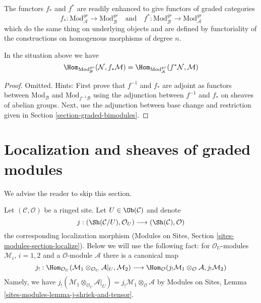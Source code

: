 \medskip\noindent
The functors $f_*$ and $f^*$ are readily enhanced to give
functors of graded categories
$$
f_* :
\text{Mod}^{gr}_\mathcal{A}
\longrightarrow
\text{Mod}^{gr}_\mathcal{B}
\quad\text{and}\quad
f^* :
\text{Mod}^{gr}_\mathcal{B}
\longrightarrow
\text{Mod}^{gr}_\mathcal{A}
$$
which do the same thing on underlying objects and are defined
by functoriality of the constructions on homogenous morphisms
of degree $n$.

\begin{lemma}
\label{lemma-adjunction-push-pull-gr}
In the situation above we have
$$
\Hom_{\text{Mod}_\mathcal{B}^{gr}}(
\mathcal{N}, f_*\mathcal{M}) =
\Hom_{\text{Mod}_\mathcal{A}^{gr}}(
f^*\mathcal{N}, \mathcal{M})
$$
\end{lemma}

\begin{proof}
Omitted. Hints: First prove that $f^{-1}$ and $f_*$ are adjoint
as functors between $\text{Mod}_\mathcal{B}$ and
$\text{Mod}_{f^{-1}\mathcal{B}}$ using the adjunction between
$f^{-1}$ and $f_*$ on sheaves of abelian groups.
Next, use the adjunction between base change and restriction
given in Section \ref{section-graded-bimodules}.
\end{proof}





\section{Localization and sheaves of graded modules}
\label{section-localize-graded}

\noindent
We advise the reader to skip this section.

\medskip\noindent
Let $(\mathcal{C}, \mathcal{O})$ be a ringed site.
Let $U \in \Ob(\mathcal{C})$ and denote
$$
j :
(\Sh(\mathcal{C}/U), \mathcal{O}_U)
\longrightarrow
(\Sh(\mathcal{C}), \mathcal{O})
$$
the corresponding localization morphism
(Modules on Sites, Section \ref{sites-modules-section-localize}).
Below we will use the following fact: for $\mathcal{O}_U$-modules
$\mathcal{M}_i$, $i = 1, 2$ and a $\mathcal{O}$-module $\mathcal{A}$
there is a canonical map
$$
j_! :
\Hom_{\mathcal{O}_U}(
\mathcal{M}_1 \otimes_{\mathcal{O}_U} \mathcal{A}|_U, \mathcal{M}_2)
\longrightarrow
\Hom_\mathcal{O}(
j_!\mathcal{M}_1 \otimes_\mathcal{O} \mathcal{A}, j_!\mathcal{M}_2)
$$
Namely, we have
$j_!(\mathcal{M}_1 \otimes_{\mathcal{O}_U} \mathcal{A}|_U) =
j_!\mathcal{M}_1 \otimes_\mathcal{O} \mathcal{A}$ by
Modules on Sites, Lemma \ref{sites-modules-lemma-j-shriek-and-tensor}.

